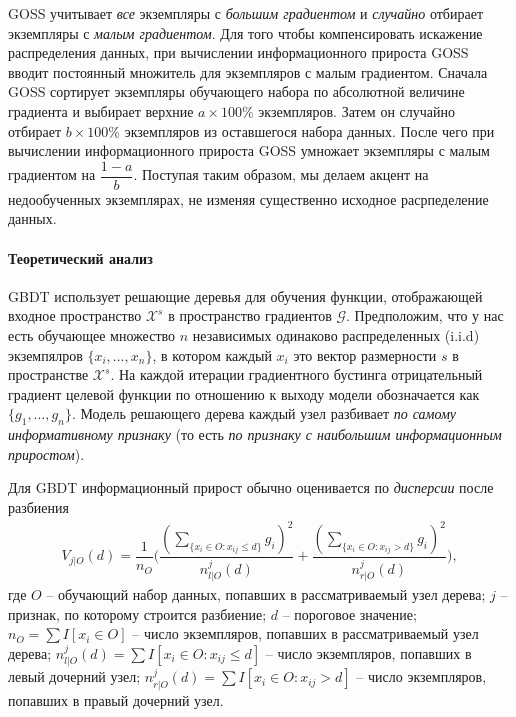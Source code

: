 \documentclass[%
	11pt,
	a4paper,
	utf8,
		]{article}
\begin{document}
{\color{blue}GOSS учитывает \emph{все} экземпляры с \emph{большим градиентом} и \emph{случайно} отбирает экземпляры с \emph{малым градиентом}.} Для того чтобы компенсировать искажение распределения данных, при вычислении информационного прироста GOSS вводит постоянный множитель для экземпляров с малым градиентом. Сначала GOSS сортирует экземпляры обучающего набора по абсолютной величине градиента и выбирает верхние $ a \times 100 \% $ экземпляров. Затем он случайно отбирает $ b \times 100\% $ экземпляров из оставшегося набора данных. После чего при вычислении информационного прироста GOSS умножает экземпляры с малым градиентом на $ \dfrac{1 - a}{b} $. Поступая таким образом, мы делаем акцент на недообученных экземплярах, не изменяя существенно исходное расрпеделение данных.

\paragraph{Теоретический анализ} GBDT использует решающие деревья для обучения функции, отображающей входное пространство $ \mathcal{X}^s $ в пространство градиентов $ \mathcal{G} $. Предположим, что у нас есть обучающее множество $ n $ независимых одинаково распределенных (i.i.d) экземпялров $ \{x_i, \ldots, x_n\} $, в котором каждый $ x_i $ это вектор размерности $ s $ в пространстве $ \mathcal{X}^s $. На каждой итерации градиентного бустинга отрицательный градиент целевой функции по отношению к выходу модели обозначается как $ \{g_1, \ldots, g_n\} $. Модель решающего дерева каждый узел разбивает \emph{по самому информативному признаку} (то есть \emph{по признаку с наибольшим информационным приростом}).

Для GBDT информационный прирост обычно оценивается по \emph{дисперсии} после разбиения
\begin{align*}
	V_{ j | O }(d) = \dfrac{1}{n_O} \Bigg( \dfrac{ (\sum_{ \{x_i \in O: x_{ij} \leqslant d \} } g_i)^2 }{ n_{l | O}^j(d) } + \dfrac{ (\sum_{\{x_i \in O: x_{ij} > d \} } g_i )^2 }{ n_{r | O}^j(d) } \Bigg),
\end{align*}
где $ O $ -- обучающий набор данных, попавших в рассматриваемый узел дерева; $ j $ -- признак, по которому строится разбиение; $ d $ -- пороговое значение; $ n_O = \sum I[x_i \in O] $ -- число экземпляров, попавших в рассматриваемый узел дерева; $ n_{ l | O }^j(d) = \sum I[x_i \in O: x_{ij} \leqslant d] $ -- число экземпляров, попавших в левый дочерний узел; $ n_{r | O}^j (d) = \sum I[x_i \in O: x_{ij} > d] $ -- число экземпляров, попавших в правый дочерний узел.
\end{document}
